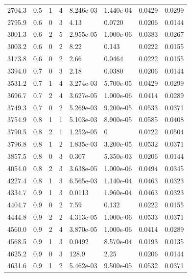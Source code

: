 \documentclass[preview]{standalone}
\begin{document}
{{{\begin{tabular}{L{1.2cm}C{1.2cm} C{0.3cm}C{0.5cm} C{1.4cm}C{1.4cm} C{1.4cm}C{1.4cm}}
  2704.3  &   0.5  & 1     &  4 &  8.246e-03  & 1.440e-04  & 0.0429 &  0.0299   \\ 
  2795.9  &   0.6  & 0     &  3 &  4.13  & 0.0720  & 0.0206 &  0.0144   \\ 
  3001.3  &   0.6  & 2     &  5 &  2.955e-05  & 1.000e-06  & 0.0383 &  0.0267   \\ 
  3003.2  &   0.6  & 0     &  2 &  8.22  & 0.143  & 0.0222 &  0.0155   \\ 
  3173.8  &   0.6  & 0     &  2 &  2.66  & 0.0464  & 0.0222 &  0.0155   \\ 
  3394.0  &   0.7  & 0     &  3 &  2.18  & 0.0380  & 0.0206 &  0.0144   \\ 
  3531.2  &   0.7  & 1     &  4 &  3.274e-03  & 5.700e-05  & 0.0429 &  0.0299   \\ 
  3696.7  &   0.7  & 2     &  4 &  3.627e-05  & 1.000e-06  & 0.0414 &  0.0289   \\ 
  3749.3  &   0.7  & 0     &  2 &  5.269e-03  & 9.200e-05  & 0.0533 &  0.0371   \\ 
  3754.9  &   0.8  & 1     &  1 &  5.103e-03  & 8.900e-05  & 0.0585 &  0.0408   \\ 
  3790.5  &   0.8  & 2     &  1 &  1.252e-05  & 0  & 0.0722 &  0.0504   \\ 
  3796.8  &   0.8  & 1     &  2 &  1.835e-03  & 3.200e-05  & 0.0532 &  0.0371   \\ 
  3857.5  &   0.8  & 0     &  3 &  0.307  & 5.350e-03  & 0.0206 &  0.0144   \\ 
  4054.0  &   0.8  & 2     &  3 &  3.638e-05  & 1.000e-06  & 0.0494 &  0.0345   \\ 
  4227.4  &   0.8  & 1     &  3 &  6.565e-03  & 1.140e-04  & 0.0463 &  0.0323   \\ 
  4334.7  &   0.9  & 1     &  3 &  0.0113  & 1.960e-04  & 0.0463 &  0.0323   \\ 
  4404.7  &   0.9  & 0     &  2 &  7.59  & 0.132  & 0.0222 &  0.0155   \\ 
  4444.8  &   0.9  & 2     &  2 &  4.313e-05  & 1.000e-06  & 0.0533 &  0.0371   \\ 
  4560.0  &   0.9  & 2     &  4 &  3.870e-05  & 1.000e-06  & 0.0414 &  0.0289   \\ 
  4568.5  &   0.9  & 1     &  3 &  0.0492  & 8.570e-04  & 0.0193 &  0.0135   \\ 
  4625.2  &   0.9  & 0     &  3 &  128.9  & 2.25  & 0.0206 &  0.0144   \\ 
  4631.6  &   0.9  & 1     &  2 &  5.462e-03  & 9.500e-05  & 0.0532 &  0.0371   \\ 

\end{tabular}}}}
\end{document}
